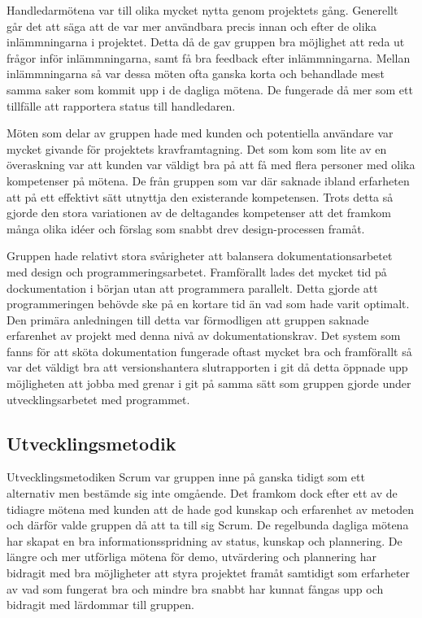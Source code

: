 Handledarmötena var till olika mycket nytta genom projektets gång. Generellt går det att säga att de var mer användbara precis innan och efter de olika inlämmningarna i projektet. Detta då de gav gruppen bra möjlighet att reda ut frågor inför inlämmningarna, samt få bra feedback efter inlämmningarna. 
Mellan inlämmningarna så var dessa möten ofta ganska korta och behandlade mest samma saker som kommit upp i de dagliga mötena. De fungerade då mer som ett tillfälle att rapportera status till handledaren.

Möten som delar av gruppen hade med kunden och potentiella användare var mycket givande för projektets kravframtagning. Det som kom som lite av en överaskning var att kunden var väldigt bra på att få med flera personer med olika kompetenser på mötena. De från gruppen som var där saknade ibland erfarheten att på ett effektivt sätt utnyttja den existerande kompetensen. 
Trots detta så gjorde den stora variationen av de deltagandes kompetenser att det framkom många olika idéer och förslag som snabbt drev design-processen framåt. 

Gruppen hade relativt stora svårigheter att balansera dokumentationsarbetet med design och programmeringsarbetet. Framförallt lades det mycket tid på dockumentation i början utan att programmera parallelt. Detta gjorde att programmeringen behövde ske på en kortare tid än vad som hade varit optimalt. Den primära anledningen till detta var förmodligen att gruppen saknade erfarenhet av projekt med denna nivå av dokumentationskrav. Det system som fanns för att sköta dokumentation fungerade oftast mycket bra och framförallt så var det väldigt bra att versionshantera slutrapporten i git då detta öppnade upp möjligheten att jobba med grenar i git på samma sätt som gruppen gjorde under utvecklingsarbetet med programmet.

\subsection{Utvecklingsmetodik}
Utvecklingsmetodiken Scrum var gruppen inne på ganska tidigt som ett alternativ men bestämde sig inte omgående. Det framkom dock efter ett av de tidiagre mötena med kunden att de hade god kunskap och erfarenhet av metoden och därför valde gruppen då att ta till sig Scrum. De regelbunda dagliga mötena har skapat en bra informationsspridning av status, kunskap och plannering. De längre och mer utförliga mötena för demo, utvärdering och plannering har bidragit med bra möjligheter att styra projektet framåt samtidigt som erfarheter av vad som fungerat bra och mindre bra snabbt har kunnat fångas upp och bidragit med lärdommar till gruppen.

